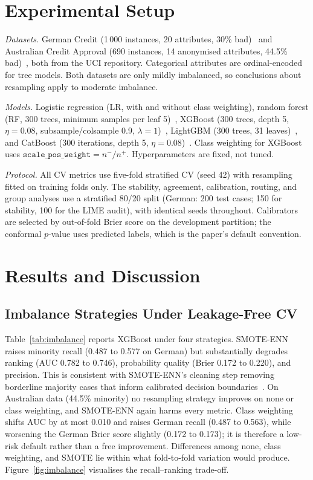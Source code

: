 \documentclass[journal]{IEEEtran}
\begin{document}
\section{Experimental Setup}
\label{sec:setup}

\emph{Datasets.} German Credit (1\,000 instances, 20 attributes, 30\% bad)~\cite{hofmann1994statlog}
and Australian Credit Approval (690 instances, 14 anonymised attributes,
44.5\% bad)~\cite{quinlan1987statlog}, both from the UCI repository. Categorical
attributes are ordinal-encoded for tree models. Both datasets are only mildly
imbalanced, so conclusions about resampling apply to moderate imbalance.

\emph{Models.} Logistic regression (LR, with and without class weighting),
random forest (RF, 300 trees, minimum samples per leaf 5)~\cite{breiman2001random},
XGBoost (300 trees, depth 5, $\eta=0.08$, subsample/colsample 0.9,
$\lambda=1$)~\cite{chen2016xgboost}, LightGBM (300 trees, 31
leaves)~\cite{ke2017lightgbm}, and CatBoost (300 iterations, depth 5,
$\eta=0.08$)~\cite{prokhorenkova2018catboost}. Class weighting for XGBoost uses
$\mathtt{scale\_pos\_weight}=n^-/n^+$. Hyperparameters are fixed, not tuned.

\emph{Protocol.} All CV metrics use five-fold stratified CV (seed 42) with
resampling fitted on training folds only. The stability, agreement,
calibration, routing, and group analyses use a stratified 80/20 split (German:
200 test cases; 150 for stability, 100 for the LIME audit), with identical
seeds throughout. Calibrators are selected by out-of-fold Brier score on the
development partition; the conformal $p$-value uses predicted labels, which is
the paper's default convention.

\section{Results and Discussion}
\label{sec:results}

\subsection{Imbalance Strategies Under Leakage-Free CV}

Table~\ref{tab:imbalance} reports XGBoost under four strategies. SMOTE-ENN
raises minority recall (0.487 to 0.577 on German) but substantially degrades
ranking (AUC 0.782 to 0.746), probability quality (Brier 0.172 to 0.220), and
precision. This is consistent with SMOTE-ENN's cleaning step removing
borderline majority cases that inform calibrated decision
boundaries~\cite{batista2004study}. On Australian data (44.5\% minority) no
resampling strategy improves on none or class weighting, and SMOTE-ENN again
harms every metric. Class weighting shifts AUC by at most 0.010 and raises
German recall (0.487 to 0.563), while worsening the German Brier score slightly
(0.172 to 0.173); it is therefore a low-risk default rather than a free
improvement. Differences among none, class weighting, and SMOTE lie within what
fold-to-fold variation would produce. Figure~\ref{fig:imbalance} visualises the
recall--ranking trade-off.
\end{document}

